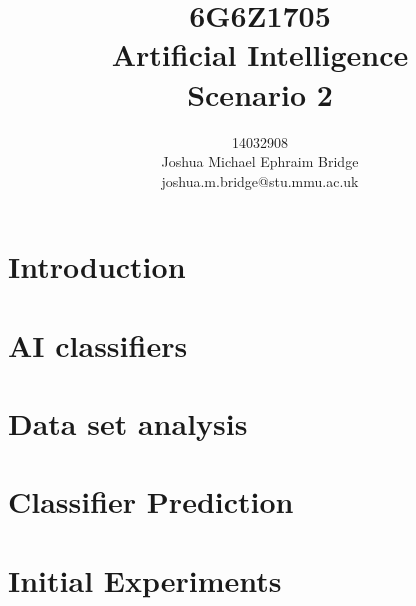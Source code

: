 \documentclass[12pt]{article}
\title{\vspace{1cm}6G6Z1705\\\textbf{Artificial Intelligence}\\\vspace{2cm}Scenario 2\\\vspace{2cm}}
\author{14032908\\Joshua Michael Ephraim Bridge\\joshua.m.bridge@stu.mmu.ac.uk\\\vspace{1cm}}
\begin{document}
\maketitle

\newpage

\doublespacing

\section{Introduction}

\section{AI classifiers}




\section{Data set analysis}

\section{Classifier Prediction}



\section{Initial Experiments}
\end{document}
